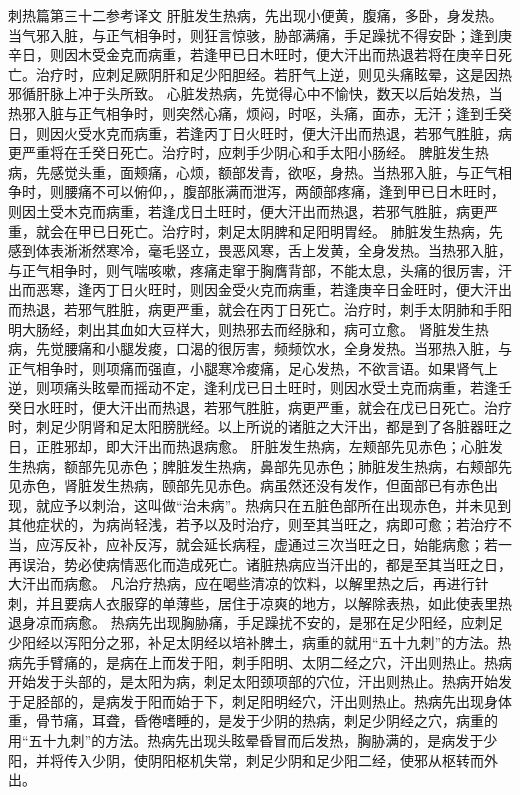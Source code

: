 \documentclass[a4paper,12pt,UTF8,twoside]{ctexbook}
\begin{document}
刺热篇第三十二参考译文
肝脏发生热病，先出现小便黄，腹痛，多卧，身发热。当气邪入脏，与正气相争时，则狂言惊骇，胁部满痛，手足躁扰不得安卧；逢到庚辛日，则因木受金克而病重，若逢甲已日木旺时，便大汗出而热退若将在庚辛日死亡。治疗时，应刺足厥阴肝和足少阳胆经。若肝气上逆，则见头痛眩晕，这是因热邪循肝脉上冲于头所致。
心脏发热病，先觉得心中不愉快，数天以后始发热，当热邪入脏与正气相争时，则突然心痛，烦闷，时呕，头痛，面赤，无汗；逢到壬癸日，则因火受水克而病重，若逢丙丁日火旺时，便大汗出而热退，若邪气胜脏，病更严重将在壬癸日死亡。治疗时，应刺手少阴心和手太阳小肠经。
脾脏发生热病，先感觉头重，面颊痛，心烦，额部发青，欲呕，身热。当热邪入脏，与正气相争时，则腰痛不可以俯仰，，腹部胀满而泄泻，两颌部疼痛，逢到甲已日木旺时，则因土受木克而病重，若逢戊日土旺时，便大汗出而热退，若邪气胜脏，病更严重，就会在甲已日死亡。治疗时，刺足太阴脾和足阳明胃经。
肺脏发生热病，先感到体表淅淅然寒冷，毫毛竖立，畏恶风寒，舌上发黄，全身发热。当热邪入脏，与正气相争时，则气喘咳嗽，疼痛走窜于胸膺背部，不能太息，头痛的很厉害，汗出而恶寒，逢丙丁日火旺时，则因金受火克而病重，若逢庚辛日金旺时，便大汗出而热退，若邪气胜脏，病更严重，就会在丙丁日死亡。治疗时，刺手太阴肺和手阳明大肠经，刺出其血如大豆样大，则热邪去而经脉和，病可立愈。
肾脏发生热病，先觉腰痛和小腿发痠，口渴的很厉害，频频饮水，全身发热。当邪热入脏，与正气相争时，则项痛而强直，小腿寒冷痠痛，足心发热，不欲言语。如果肾气上逆，则项痛头眩晕而摇动不定，逢利戊已日土旺时，则因水受土克而病重，若逢壬癸日水旺时，便大汗出而热退，若邪气胜脏，病更严重，就会在戊已日死亡。治疗时，刺足少阴肾和足太阳膀胱经。以上所说的诸脏之大汗出，都是到了各脏器旺之日，正胜邪却，即大汗出而热退病愈。
肝脏发生热病，左颊部先见赤色；心脏发生热病，额部先见赤色；脾脏发生热病，鼻部先见赤色；肺脏发生热病，右颊部先见赤色，肾脏发生热病，颐部先见赤色。病虽然还没有发作，但面部已有赤色出现，就应予以刺治，这叫做“治未病”。热病只在五脏色部所在出现赤色，并未见到其他症状的，为病尚轻浅，若予以及时治疗，则至其当旺之，病即可愈；若治疗不当，应泻反补，应补反泻，就会延长病程，虚通过三次当旺之日，始能病愈；若一再误治，势必使病情恶化而造成死亡。诸脏热病应当汗出的，都是至其当旺之日，大汗出而病愈。
凡治疗热病，应在喝些清凉的饮料，以解里热之后，再进行针刺，并且要病人衣服穿的单薄些，居住于凉爽的地方，以解除表热，如此使表里热退身凉而病愈。
热病先出现胸胁痛，手足躁扰不安的，是邪在足少阳经，应刺足少阳经以泻阳分之邪，补足太阴经以培补脾土，病重的就用“五十九刺”的方法。热病先手臂痛的，是病在上而发于阳，刺手阳明、太阴二经之穴，汗出则热止。热病开始发于头部的，是太阳为病，刺足太阳颈项部的穴位，汗出则热止。热病开始发于足胫部的，是病发于阳而始于下，刺足阳明经穴，汗出则热止。热病先出现身体重，骨节痛，耳聋，昏倦嗜睡的，是发于少阴的热病，刺足少阴经之穴，病重的用“五十九刺”的方法。热病先出现头眩晕昏冒而后发热，胸胁满的，是病发于少阳，并将传入少阴，使阴阳枢机失常，刺足少阴和足少阳二经，使邪从枢转而外出。
\end{document}
